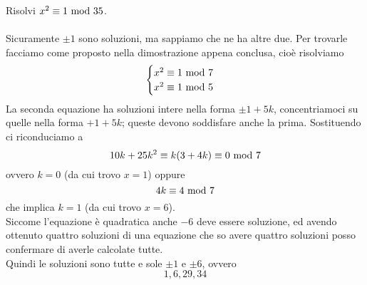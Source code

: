 \begin{esercizio}
	Risolvi $x^2\equiv1\ \mathrm{mod}\ 35$.\\ \\ Sicuramente $\pm1$ sono soluzioni, ma sappiamo che ne ha altre due. Per trovarle facciamo come proposto nella dimostrazione appena conclusa, cioè risolviamo
	\begin{equation*}
	\begin{cases}
	x^2\equiv1\ \mathrm{mod}\ 7\\
	x^2\equiv1\ \mathrm{mod}\ 5
	\end{cases}
	\end{equation*}
	La seconda equazione ha soluzioni intere nella forma $\pm1+5k$, concentriamoci su quelle nella forma $+1+5k$; queste devono soddisfare anche la prima. Sostituendo ci riconduciamo a 
	\begin{equation*}
	10k+25k^2\equiv k(3+4k)\equiv0\ \mathrm{mod}\ 7
	\end{equation*}
	ovvero $k=0$ (da cui trovo $x=1$) oppure 
	\begin{equation*}
	4k\equiv4\ \mathrm{mod}\ 7
	\end{equation*}
	che implica $k=1$ (da cui trovo $x=6$). \\ Siccome l'equazione è quadratica anche $-6$ deve essere soluzione, ed avendo ottenuto quattro soluzioni di una equazione che so avere quattro soluzioni posso confermare di averle calcolate tutte. \\ Quindi le soluzioni sono tutte e sole $\pm1$ e $\pm6$, ovvero 
	\begin{equation*}
	1,6,29,34
	\end{equation*}
\end{esercizio}
